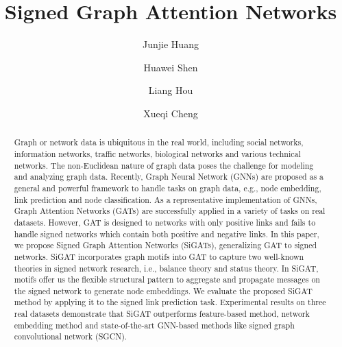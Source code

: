 \documentclass[runningheads]{llncs}
\begin{document}
\newcommand{\name}{SiGAT}
\newcommand{\V}{\mathcal{V}}
\newcommand{\E}{\mathcal{E}}
\newcommand{\G}{\mathcal{G}}
\newcommand{\nedge}{k}
\newcommand{\mb}{\mathbf}
\newcommand{\eg}{e.g., }
\newcommand{\ie}{i.e., }


\title{Signed Graph Attention Networks}
\author{Junjie Huang \and
Huawei Shen \and
Liang Hou \and Xueqi Cheng}
\maketitle              \begin{abstract}
Graph or network data is ubiquitous in the real world, including social networks, information networks, traffic networks, biological networks and various technical networks. The non-Euclidean nature of graph data poses the challenge for modeling and analyzing graph data. Recently, Graph Neural Network (GNNs) are proposed as a general and powerful framework to handle tasks on graph data, e.g., node embedding, link prediction and node classification. As a representative implementation of GNNs, Graph Attention Networks (GATs) are successfully applied in a variety of tasks on real datasets. However, GAT is designed to networks with only positive links and fails to handle signed networks which contain both positive and negative links. In this paper, we propose Signed Graph Attention Networks (SiGATs), generalizing GAT to signed networks. SiGAT incorporates graph motifs into GAT to capture two well-known theories in signed network research, i.e., balance theory and status theory. In SiGAT, motifs offer us the flexible structural pattern to aggregate and propagate messages on the signed network to generate node embeddings. We evaluate the proposed SiGAT method by applying it to the signed link prediction task. Experimental results on three real datasets demonstrate that SiGAT outperforms feature-based method, network embedding method and state-of-the-art GNN-based methods like signed graph convolutional network (SGCN).

\end{abstract}
\end{document}
